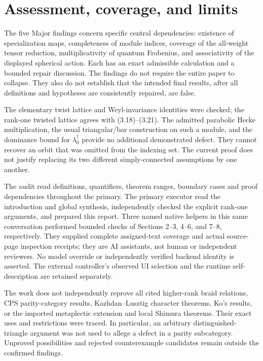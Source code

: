 \documentclass[10pt]{article}
\begin{document}
\section*{Assessment, coverage, and limits}
The five Major findings concern specific central dependencies: existence of specialization maps, completeness of module indices, coverage of the all-weight tensor reduction, multiplicativity of quantum Frobenius, and associativity of the displayed spherical action. Each has an exact admissible calculation and a bounded repair discussion. The findings do not require the entire paper to collapse. They also do not establish that the intended final results, after all definitions and hypotheses are consistently repaired, are false.\par
The elementary twist lattice and Weyl-invariance identities were checked; the rank-one twisted lattice agrees with (3.18)–(3.21). The admitted parabolic Hecke multiplication, the usual triangular/bar construction on such a module, and the dominance bound for \(\lambda_0^\dagger\) provide no additional demonstrated defect. They cannot recover an orbit that was omitted from the indexing set. The current proof does not justify replacing its two different simply-connected assumptions by one another.\par
The audit read definitions, quantifiers, theorem ranges, boundary cases and proof dependencies throughout the primary. The primary executor read the introduction and global synthesis, independently checked the explicit rank-one arguments, and prepared this report. Three named native helpers in this same conversation performed bounded checks of Sections 2–3, 4–6, and 7–8, respectively. They supplied complete assigned-text coverage and actual source-page inspection receipts; they are AI assistants, not human or independent reviewers. No model override or independently verified backend identity is asserted. The external controller’s observed UI selection and the runtime self-description are retained separately.\par
The work does not independently reprove all cited higher-rank braid relations, CPS parity-category results, Kazhdan–Lusztig character theorems, Ko’s results, or the imported metaplectic extension and local Shimura theorems. Their exact uses and restrictions were traced. In particular, an arbitrary distinguished-triangle argument was not used to allege a defect in a parity subcategory. Unproved possibilities and rejected counterexample candidates remain outside the confirmed findings.\par
\end{document}
